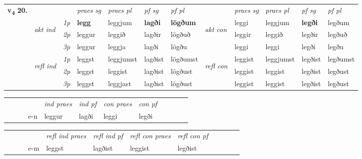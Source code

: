 \begin{tabular}{llllllllllll} \toprule
\multirow{4}{*}{{{\textbf{v{\textsubscript{4}}} \Large{\textbf{20.}}}}}  & &   &  \textit{praes sg}  & \textit{praes pl}  &\textit{ pf sg} & \textit{pf pl} &  &  \textit{praes sg}  & \textit{praes pl}  & \textit{pf sg} & \textit{pf pl } \\*
	\cmidrule{4-7} \cmidrule{9-12}
 & \multirow{3}{*}{\begin{turn}{90}\textit{akt ind}\end{turn}} & {\textit{1p}} & \textbf{legg} & leggjum    & \textbf{lagði} & \textbf{lögðum} & \multirow{3}{*}{\begin{turn}{90}\textit{akt con}\end{turn}} &leggi & leggjum & \textbf{legði} & legðum\\*
& &  {\textit{2p}} &  leggur  & leggið   & lagðir & lögðuð & & leggir & leggið & legðir & legðuð \\*
& &  {\textit{3p}} & leggur & leggja   & lagði & lögðu & & leggi & leggi& legði & legðu  \\*
\cmidrule{4-7} \cmidrule{9-12}
 &\multirow{3}{*}{\begin{turn}{90}\textit{refl ind}\end{turn}} & {\textit{1p}} & leggst & leggjumst    & lagðist & lögðumst & \multirow{3}{*}{\begin{turn}{90}\textit{refl con}\end{turn}}  &leggist & leggjumst & legðist & legðumst\\*
 &&  {\textit{2p}} &  leggst  & leggist   & lagðist & lögðust & &leggist & leggist & legðist & legðust \\*
& &  {\textit{3p}} & leggst & leggjast   & lagðist & lögðust & & leggist & leggist& legðist & legðust  \\*
\cmidrule{4-7} \cmidrule{9-12}
\end{tabular}


\begin{tabular}{llllllllllll}
 & &  & &  \textit{ind praes} & \textit{ind pf} & \textit{con praes} & \textit{con pf} \\*
&  & & e-n & leggur & lagði & leggi & legði \\*
\cmidrule{5-9}
\end{tabular}


\begin{tabular}{llllllllllll}
 & &  & &  \textit{refl ind praes} & \textit{refl ind pf} & \textit{refl con praes} & \textit{refl con pf} \\*
&  & & e-m & leggst & lagðist & leggist & legðist \\*
\cmidrule{5-9}
\end{tabular}


